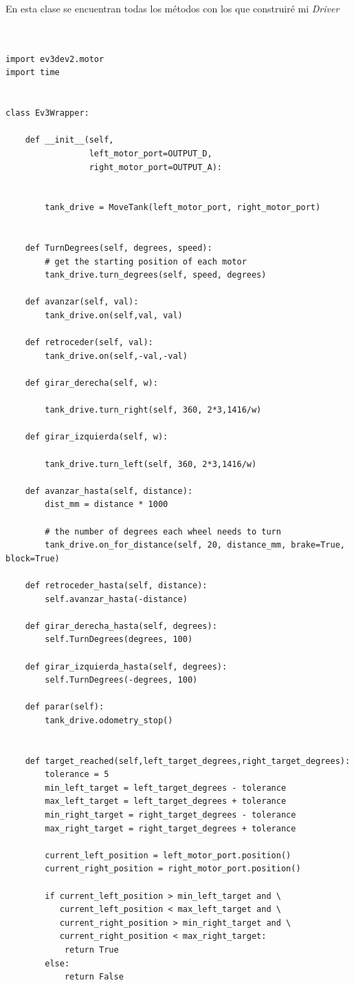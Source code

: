 En esta clase se encuentran todas los métodos con los que construiré mi \textit{Driver}


\begin{lstlisting}[frame=single,breaklines=true, label=Driver Actuadores, caption=Drivers,  captionpos=b]


import ev3dev2.motor
import time


class Ev3Wrapper:

    def __init__(self,
                 left_motor_port=OUTPUT_D,
                 right_motor_port=OUTPUT_A):


        tank_drive = MoveTank(left_motor_port, right_motor_port)


    def TurnDegrees(self, degrees, speed):
        # get the starting position of each motor
        tank_drive.turn_degrees(self, speed, degrees)

    def avanzar(self, val):
        tank_drive.on(self,val, val)

    def retroceder(self, val):
        tank_drive.on(self,-val,-val)

    def girar_derecha(self, w):

        tank_drive.turn_right(self, 360, 2*3,1416/w)

    def girar_izquierda(self, w):

        tank_drive.turn_left(self, 360, 2*3,1416/w)

    def avanzar_hasta(self, distance):
        dist_mm = distance * 1000

        # the number of degrees each wheel needs to turn
        tank_drive.on_for_distance(self, 20, distance_mm, brake=True, block=True)

    def retroceder_hasta(self, distance):
        self.avanzar_hasta(-distance)

    def girar_derecha_hasta(self, degrees):
        self.TurnDegrees(degrees, 100)

    def girar_izquierda_hasta(self, degrees):
        self.TurnDegrees(-degrees, 100)

    def parar(self):
        tank_drive.odometry_stop()


    def target_reached(self,left_target_degrees,right_target_degrees):
        tolerance = 5
        min_left_target = left_target_degrees - tolerance
        max_left_target = left_target_degrees + tolerance
        min_right_target = right_target_degrees - tolerance
        max_right_target = right_target_degrees + tolerance

        current_left_position = left_motor_port.position()
        current_right_position = right_motor_port.position()

        if current_left_position > min_left_target and \
           current_left_position < max_left_target and \
           current_right_position > min_right_target and \
           current_right_position < max_right_target:
            return True
        else:
            return False
\end{lstlisting}


